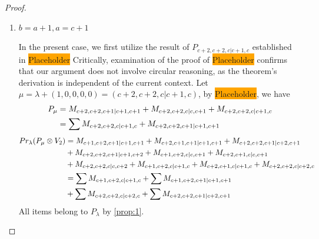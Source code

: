 \begin{proof}
\begin{enumerate}
\begin{enumerate}
        \item $b=a+1,a=c+1$ \par
        In the present case, we first utilize the result of $P_{c+2,c+2,c|c+1,c}$ established in \colorbox{orange}{Placeholder} Critically, examination of the proof of \colorbox{orange}{Placeholder} confirms that our argument does not involve circular reasoning, as the theorem's derivation is independent of the current context. Let $\mu = \lambda + (1,0,0,0,0) =(c+2,c+2,c|c+1,c) $, by \colorbox{orange}{Placeholder}, we have
        \begin{equation}\notag
          \begin{aligned}
            P_\mu &= 
M_{c+2,c+2,c+1|c+1,c+1}
+M_{c+2,c+2,c|c,c+1}
+M_{c+2,c+2,c|c+1,c}\\
                  &=
\sum M_{c+2,c+2,c|c+1,c}
+ M_{c+2,c+2,c+1|c+1,c+1}
          \end{aligned}
        \end{equation}
        \begin{equation}\notag
          \begin{aligned}
            Pr_{\lambda}(P_\mu \otimes V_{2}) &=
M_{c+1,c+2,c+1|c+1,c+1}
+ M_{c+2,c+1,c+1|c+1,c+1}
+ M_{c+2,c+2,c+1|c+2,c+1}\\
                                              &
+ M_{c+2,c+2,c+1|c+1,c+2}
+ M_{c+1,c+2,c|c,c+1}
+ M_{c+2,c+1,c|c,c+1}\\
                                              &
+ M_{c+2,c+2,c|c,c+2}
+ M_{c+1,c+2,c|c+1,c}
+ M_{c+2,c+1,c|c+1,c}
+ M_{c+2,c+2,c|c+2,c} \\
                                               &=
\sum M_{c+1,c+2,c|c+1,c}
+ \sum M_{c+1,c+2,c+1|c+1,c+1}\\
                                              &
+ \sum M_{c+2,c+2,c|c+2,c}
+ \sum M_{c+2,c+2,c+1|c+2,c+1}
          \end{aligned}
        \end{equation}
All items belong to $P_\lambda$ by \cref{prop:1}.
      \end{enumerate}


\end{enumerate}
\end{proof}
